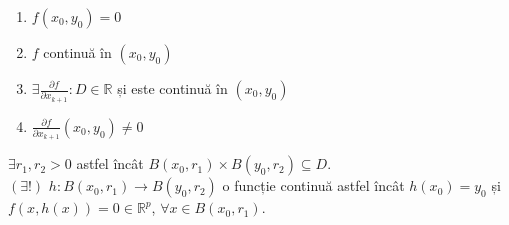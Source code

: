 \begin{enumerate}[label=\emph{\alph*})]
    \item $f(x_{0}, y_{0}) = 0$
    \item $f$ continuă în $(x_{0}, y_{0})$
    \item $\exists \displaystyle\frac{\partial f}{\partial x_{k+1}}:D \in \mathbb{R}$ și este continuă în $(x_{0}, y_{0})$
    \item $\displaystyle\frac{\partial f}{\partial x_{k+1}}(x_{0}, y_{0}) \neq 0$
\end{enumerate}
$\exists r_{1}, r_{2} > 0$ astfel încât $B(x_{0}, r_{1}) \times B(y_{0}, r_{2}) \subseteq D$. \\
$(\exists !)$ $h: B(x_{0}, r_{1}) \rightarrow B(y_{0}, r_{2})$ o funcție continuă astfel încât $h(x_{0}) = y_{0}$ și
$f(x, h(x)) = 0 \in \mathbb{R}^{p}$, $\forall x \in B(x_{0}, r_{1})$.
